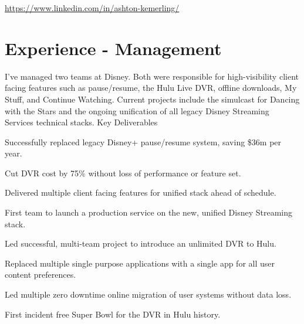 \documentclass[]{deedy-resume-openfont}
\begin{document}
%
%
\lastupdated

%
%



\href{https://www.linkedin.com/in/ashton-kemerling/}{https://www.linkedin.com/in/ashton-kemerling/}

\begin{center}
\end{center}

\section{Experience - Management}

\vspace{\topsep} %
I've managed two teams at Disney. Both were responsible for high-visibility client facing features such as pause/resume, the Hulu Live DVR, offline downloads, My Stuff, and Continue Watching. Current projects include the simulcast for Dancing with the Stars and the ongoing unification of all legacy Disney Streaming Services technical stacks.
\vspace{\topsep}
\newline
Key Deliverables
\begin{tightemize}
\item Successfully replaced legacy Disney+ pause/resume system, saving \$36m per year.
\item Cut DVR cost by 75\% without loss of performance or feature set.
\item Delivered multiple client facing features for unified stack ahead of schedule.
\item First team to launch a production service on the new, unified Disney Streaming stack.
\item Led successful, multi-team project to introduce an unlimited DVR to Hulu.
\item Replaced multiple single purpose applications with a single app for all user content preferences.
\item Led multiple zero downtime online migration of user systems without data loss.
\item First incident free Super Bowl for the DVR in Hulu history.
\end{tightemize}
\end{document}
